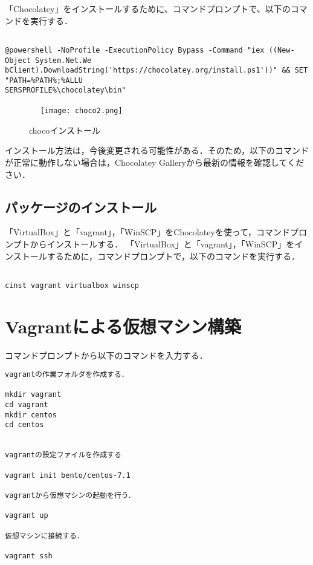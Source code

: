 「Chocolatey」をインストールするために、コマンドプロンプトで、以下のコマンドを実行する．

\begin{verbatim}

@powershell -NoProfile -ExecutionPolicy Bypass -Command "iex ((New-Object System.Net.We
bClient).DownloadString('https://chocolatey.org/install.ps1'))" && SET "PATH=%PATH%;%ALLU
SERSPROFILE%\chocolatey\bin"

\end{verbatim}

\newpage

\begin{figure}[htb]
\centering　
\texttt{[image: choco2.png]}
\caption{chocoインストール}\label{tab:uac}
\end{figure}


インストール方法は，今後変更される可能性がある．そのため，以下のコマンドが正常に動作しない場合は，Chocolatey Galleryから最新の情報を確認してください．


\subsection{パッケージのインストール}
「VirtualBox」と「vagrant」，「WinSCP」をChocolateyを使って，コマンドプロンプトからインストールする．
「VirtualBox」と「vagrant」，「WinSCP」をインストールするために，コマンドプロンプトで，以下のコマンドを実行する．

\begin{verbatim}

cinst vagrant virtualbox winscp

\end{verbatim}

\section{Vagrantによる仮想マシン構築}

コマンドプロンプトから以下のコマンドを入力する．
\begin{verbatim}
vagrantの作業フォルダを作成する．

mkdir vagrant
cd vagrant
mkdir centos
cd centos


vagrantの設定ファイルを作成する

vagrant init bento/centos-7.1

vagrantから仮想マシンの起動を行う．

vagrant up

仮想マシンに接続する．

vagrant ssh

\end{verbatim}




